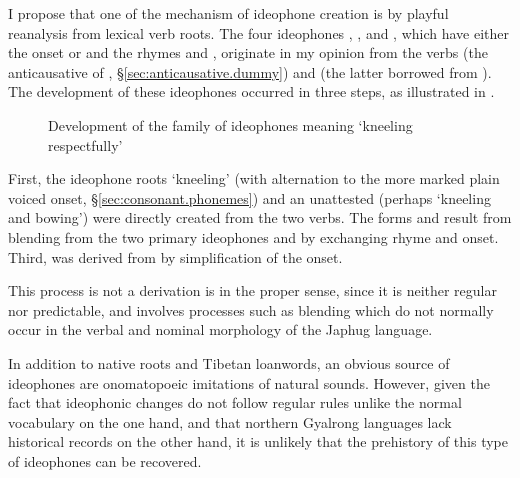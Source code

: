 I propose that one of the mechanism of ideophone creation is by playful reanalysis from lexical verb roots. The four ideophones , ,  and , which have either the onset  or  and the rhymes  and , originate in my opinion from the verbs  (the anticausative of , §\ref{sec:anticausative.dummy}) and  (the latter borrowed from ). The development of these ideophones occurred in three steps, as illustrated in .


\begin{figure}[H]
\caption{Development of the family of ideophones meaning `kneeling respectfully'} \label{fig:idph.dzoR}  
\end{figure}

First, the ideophone roots  `kneeling' (with alternation to the more marked plain voiced  onset, §\ref{sec:consonant.phonemes}) and an unattested  (perhaps `kneeling and bowing') were directly created from the two verbs. The forms  and  result from blending from the two primary ideophones  and  by exchanging rhyme and onset. Third,  was derived from  by simplification of the onset.

This process is not a derivation is in the proper sense, since it is neither regular nor predictable, and involves processes such as blending which do not normally occur in the verbal and nominal morphology of the Japhug language.

In addition to native roots and Tibetan loanwords, an obvious source of ideophones are onomatopoeic imitations of natural sounds. However, given the fact that ideophonic changes do not follow regular rules unlike the normal vocabulary on the one hand, and that northern Gyalrong languages lack historical records on the other hand, it is unlikely that the prehistory of this type of ideophones can be recovered.


